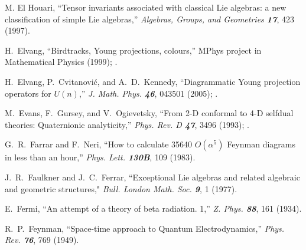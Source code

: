  M. El Houari,
    ``Tensor invariants associated with classical
      Lie algebras: a new classification of simple Lie algebras,''
    {\em Algebras, Groups, and Geometries \bf 17}, 423 (1997).

 H.~Elvang,
    ``Birdtracks, Young projections, colours,''
     MPhys project in Mathematical Physics (1999);
  .

 H.~Elvang, P.~Cvitanovi\'c, and A.~D.~Kennedy,
    ``Diagrammatic Young projection operators for $U(n)$,''
        {\em J. Math. Phys. \bf 46}, 043501 (2005);
    .

M.~Evans, F.~Gursey, and V.~Ogievetsky,
``From 2-D conformal to 4-D selfdual theories: Quaternionic analyticity,''
{\em Phys.  Rev.    D \bf 47}, 3496 (1993);
.



G.~R.~Farrar and F.~Neri,
``How to calculate 35640 $O(\alpha^5)$ Feynman diagrams in less than an
hour,''
{\em Phys.  Lett.    \bf 130B}, 109 (1983).


 J.~R.~Faulkner and J.~C.~Ferrar,
    ``Exceptional Lie algebras
    and related algebraic and geometric structures,"
    {\em Bull. London Math. Soc.  \bf 9}, 1 (1977).

 E.~Fermi,
``An attempt of a theory of beta radiation. 1,''
{\em Z.  Phys.    \bf 88}, 161 (1934).



 R.~P.~Feynman,
``Space-time approach to {Quantum Electrodynamics},''
{\em Phys. Rev. \bf 76}, 769 (1949). %

